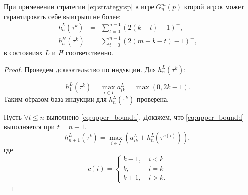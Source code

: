 \begin{prop}
При применении стратегии \eqref{eq:strategy:sp} в игре $ G_n^m(p) $ второй игрок может гарантировать себе выигрыш не более:
\begin{eqnarray}
\label{eq:upper_bound:l}
h_n^L(\tau^k) &=& \sum_{t=0}^{n-1}
    (2(k - t) - 1)^+,\\
\label{eq:upper_bound:h}
h_n^H(\tau^k) &=& \sum_{t=0}^{n-1}
    (2(m - k - t) - 1)^+,
\end{eqnarray}
в состояниях $ L $ и $ H $ соответственно.
\end{prop}
\begin{proof}
Проведем доказательство по индукции.
Для $ h_n^L(\tau^k) $:

\[ 
h_1^L(\tau^k) = \max_{i \in I} a_{ik}^L = \max(0, 2k - 1).
\]
Таким образом база индукции для $ h_n^L(\tau^k) $ проверена. 

Пусть $ \forall t \leq n $ выполнено \eqref{eq:upper_bound:l}. Докажем, что \eqref{eq:upper_bound:l} выполняется при $ t=n+1 $.
\[
h_{n+1}^L(\tau^k) = \max_{i \in I} (a_{ik}^L + h_n^L(\tau^{c(i)})),
\]
где
\[ 
c(i) = \begin{cases}
    k - 1, &\, i < k \\
    k, &\, i = k \\
    k + 1, &\, i > k.
\end{cases}
\]


\end{proof}
